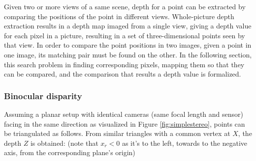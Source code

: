 Given two or more views of a same scene, depth for a point can be extracted by comparing the positions of the point in different views.
Whole-picture depth extraction results in a depth map imaged from a single view, giving a depth value for each pixel in a picture, resulting in a set of three-dimensional points seen by that view.
In order to compare the point positions in two images, given a point in one image, its matching pair must be found on the other.
In the following section, this search problem in finding corresponding pixels, mapping them so that they can be compared, and the comparison that results a depth value is formalized.


\subsubsection{Binocular disparity} \label{sec:binocular} %




Assuming a planar setup with identical cameras (same focal length and sensor) facing in the same direction as visualized in Figure \ref{fig:simplestereo}, points can be triangulated as follows.
From similar triangles with a common vertex at $X$, the depth $Z$ is obtained: (note that $x_r < 0$ as it's to the left, towards to the negative axis, from the corresponding plane's origin)

